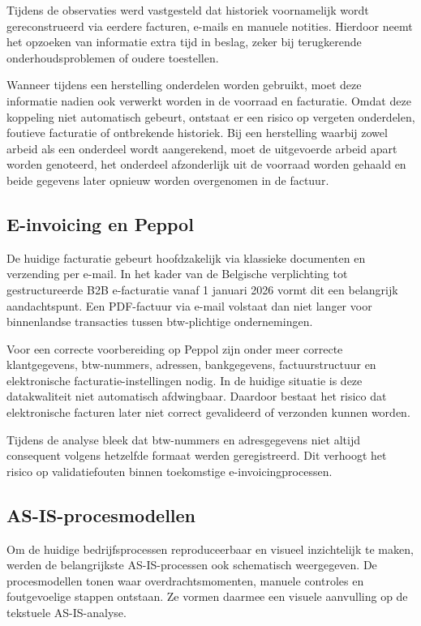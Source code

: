 Tijdens de observaties werd vastgesteld dat historiek voornamelijk wordt gereconstrueerd via eerdere facturen, e-mails en manuele notities. Hierdoor neemt het opzoeken van informatie extra tijd in beslag, zeker bij terugkerende onderhoudsproblemen of oudere toestellen.

Wanneer tijdens een herstelling onderdelen worden gebruikt, moet deze informatie nadien ook verwerkt worden in de voorraad en facturatie. Omdat deze koppeling niet automatisch gebeurt, ontstaat er een risico op vergeten onderdelen, foutieve facturatie of ontbrekende historiek. Bij een herstelling waarbij zowel arbeid als een onderdeel wordt aangerekend, moet de uitgevoerde arbeid apart worden genoteerd, het onderdeel afzonderlijk uit de voorraad worden gehaald en beide gegevens later opnieuw worden overgenomen in de factuur.

\subsection{E-invoicing en Peppol}

De huidige facturatie gebeurt hoofdzakelijk via klassieke documenten en verzending per e-mail. In het kader van de Belgische verplichting tot gestructureerde B2B e-facturatie vanaf 1 januari 2026 vormt dit een belangrijk aandachtspunt. Een PDF-factuur via e-mail volstaat dan niet langer voor binnenlandse transacties tussen btw-plichtige ondernemingen.

Voor een correcte voorbereiding op Peppol zijn onder meer correcte klantgegevens, btw-nummers, adressen, bankgegevens, factuurstructuur en elektronische facturatie-instellingen nodig. In de huidige situatie is deze datakwaliteit niet automatisch afdwingbaar. Daardoor bestaat het risico dat elektronische facturen later niet correct gevalideerd of verzonden kunnen worden.

Tijdens de analyse bleek dat btw-nummers en adresgegevens niet altijd consequent volgens hetzelfde formaat werden geregistreerd. Dit verhoogt het risico op validatiefouten binnen toekomstige e-invoicingprocessen.

\subsection{AS-IS-procesmodellen}

Om de huidige bedrijfsprocessen reproduceerbaar en visueel inzichtelijk te maken, werden de belangrijkste AS-IS-processen ook schematisch weergegeven. De procesmodellen tonen waar overdrachtsmomenten, manuele controles en foutgevoelige stappen ontstaan. Ze vormen daarmee een visuele aanvulling op de tekstuele AS-IS-analyse.

